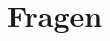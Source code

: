 \documentclass[aspectratio=1610,t]{beamer}
\begin{document}
%
%
%
%
%
%
%
%

{
\section{Fragen}
}
\end{document}
